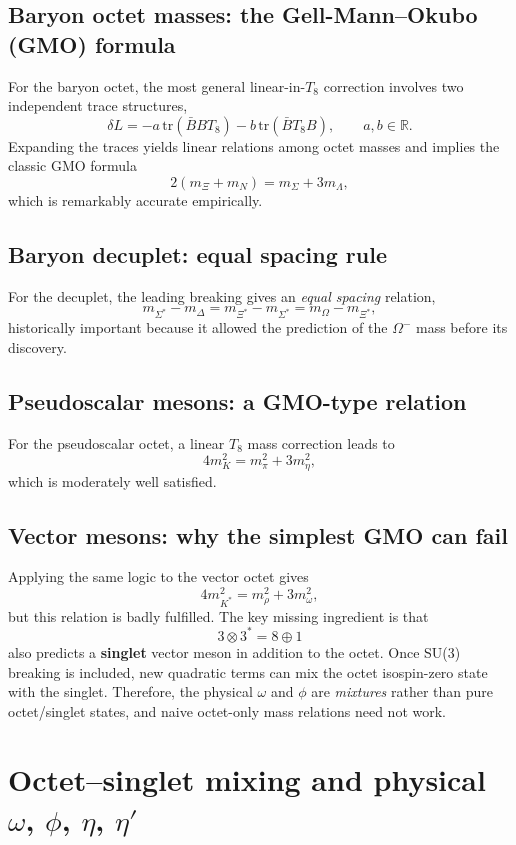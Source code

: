 \subsection{Baryon octet masses: the Gell-Mann--Okubo (GMO) formula}
For the baryon octet, the most general linear-in-$T_8$ correction involves two independent trace structures,
\[
\delta L = -a\,\mathrm{tr}(\bar B B T_8) - b\,\mathrm{tr}(\bar B T_8 B),
\qquad a,b\in\mathbb{R}.
\]
Expanding the traces yields linear relations among octet masses and implies the classic GMO formula
\[
2(m_\Xi + m_N) = m_\Sigma + 3m_\Lambda,
\]
which is remarkably accurate empirically.

\subsection{Baryon decuplet: equal spacing rule}
For the decuplet, the leading breaking gives an \emph{equal spacing} relation,
\[
m_{\Sigma^*}-m_\Delta = m_{\Xi^*}-m_{\Sigma^*}=m_\Omega-m_{\Xi^*},
\]
historically important because it allowed the prediction of the $\Omega^-$ mass before its discovery.

\subsection{Pseudoscalar mesons: a GMO-type relation}
For the pseudoscalar octet, a linear $T_8$ mass correction leads to
\[
4m_K^2 = m_\pi^2 + 3m_\eta^2,
\]
which is moderately well satisfied.

\subsection{Vector mesons: why the simplest GMO can fail}
Applying the same logic to the vector octet gives
\[
4m_{K^*}^2 = m_\rho^2 + 3m_\omega^2,
\]
but this relation is badly fulfilled. The key missing ingredient is that
\[
3\otimes 3^* = 8\oplus 1
\]
also predicts a \textbf{singlet} vector meson in addition to the octet. Once SU(3) breaking is included, new quadratic terms can mix the octet isospin-zero state with the singlet. Therefore, the physical $\omega$ and $\phi$ are \emph{mixtures} rather than pure octet/singlet states, and naive octet-only mass relations need not work.

\section{Octet--singlet mixing and physical $\omega$, $\phi$, $\eta$, $\eta'$}
